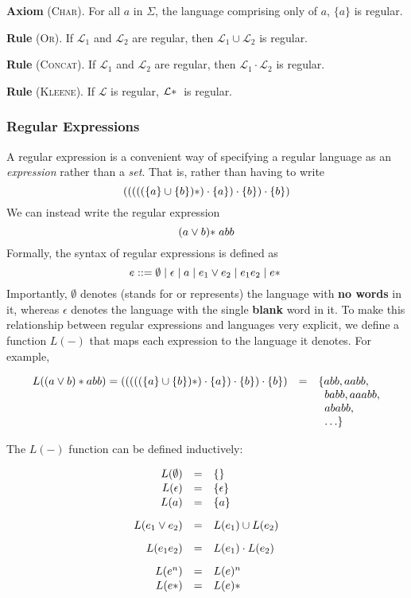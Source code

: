 \textsf{\textbf{Axiom}} \textsc{(Char)}. For all $a$ in $\Sigma$, the language comprising only of $a$, $\{a\}$ is regular.

\textsf{\textbf{Rule}} \textsc{(Or)}. If $\mathcal{L}_1$ and $\mathcal{L}_2$ are regular, then $\mathcal{L}_1 \cup \mathcal{L}_2$ is regular. 

\textsf{\textbf{Rule}} \textsc{(Concat)}. If $\mathcal{L}_1$ and $\mathcal{L}_2$ are regular, then $\mathcal{L}_1 \cdot \mathcal{L}_2$ is regular. 

\textsf{\textbf{Rule}} \textsc{(Kleene)}. If $\mathcal{L}$ is regular,  $\mathcal{L}\*$ is regular. 

\subsubsection{Regular Expressions}
A regular expression is a convenient way of specifying a regular language as an \emph{expression} rather than a \emph{set}. That is, rather than having to write
\[ (((((\{ a \} \cup \{ b \})\*) \cdot \{ a \}) \cdot \{ b \}) \cdot \{ b \}) \]
We can instead write the regular expression
\[ (a \lor b) \* abb \]
Formally, the syntax of regular expressions is defined as
\[ e ::= \emptyset \mid \epsilon \mid a \mid e_1 \lor e_2 \mid e_1 e_2 \mid e\* \]
Importantly, $\emptyset$ denotes (stands for or represents) the language with \textbf{no words} in it, whereas $\epsilon$ denotes the language with the single \textbf{blank} word in it. To make this relationship between regular expressions and languages very explicit, we define a function $L(-)$ that maps each expression to the language it denotes. For example,

\[
\begin{array}{rcl}
L((a \vee b)*abb) = (((((\{ a \} \cup \{ b \})\*) \cdot \{ a \}) \cdot \{ b \}) \cdot \{ b \}) &=& \{ abb, aabb,\\
&&\;\; babb, aaabb,\\
&&\;\; ababb,\\
&&\;\;\ldots\}
\end{array}
\]

The $L(-)$ function can be defined inductively:

\[
\begin{array}{rcl}
L(\emptyset) &=& \{\}\\[0.2ex]
L(\epsilon) &=& \{\epsilon\}\\[0.2ex]
L(a) &=& \{a\}\\[2ex]
L(e_1  \vee  e_2) &=& L(e_1) \cup L(e_2)\\[2ex]
L(e_1e_2) &=& L(e_1) \cdot L(e_2) \\[2ex]
L(e^n) &=& L(e)^n\\[0.2ex]
L(e*) &=& L(e)\*
\end{array}
\]

